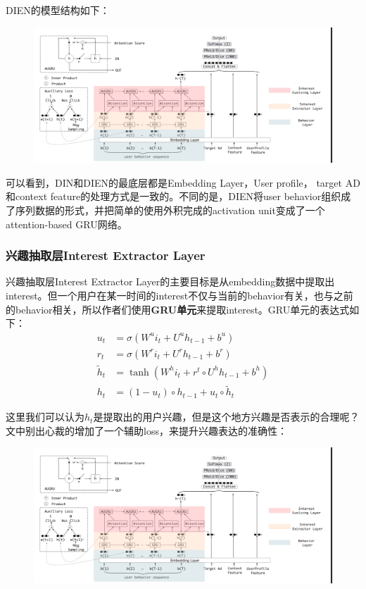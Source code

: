 \documentclass[12pt]{article}
\begin{document}
DIEN的模型结构如下：
\begin{figure}[H]
    \centering
    \includegraphics[width=1\textwidth]{fig/DIEN_Compare_DIEN.png}
\end{figure}

可以看到，DIN和DIEN的最底层都是Embedding Layer，User profile， target AD和context feature的处理方式是一致的。不同的是，DIEN将user behavior组织成了序列数据的形式，并把简单的使用外积完成的activation unit变成了一个attention-based GRU网络。

\subsubsection{兴趣抽取层Interest Extractor Layer}
兴趣抽取层Interest Extractor Layer的主要目标是从embedding数据中提取出interest。但一个用户在某一时间的interest不仅与当前的behavior有关，也与之前的behavior相关，所以作者们使用\textbf{GRU单元}来提取interest。GRU单元的表达式如下：
\begin{align*}
u_t &= \sigma(W^ui_t + U^uh_{t-1} + b^u) \\
r_t &= \sigma(W^ri_t + U^rh_{t-1} + b^r) \\
\tilde{h}_t &= \tanh(W^hi_t + r^t \circ U^h h_{t-1} + b^h) \\
h_t &= (1-u_t) \circ h_{t-1} + u_t \circ \tilde{h}_t
\end{align*}

这里我们可以认为$h_t$是提取出的用户兴趣，但是这个地方兴趣是否表示的合理呢？文中别出心裁的增加了一个辅助loss，来提升兴趣表达的准确性：
\begin{figure}[H]
    \centering
    \includegraphics[width=1\textwidth]{fig/DIEN_Compare_DIEN.png}
\end{figure}
\end{document}
